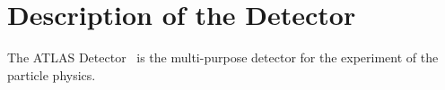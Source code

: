 \chapter{Description of the Detector}
The ATLAS Detector~\cite{Aad:2008zzm} is the multi-purpose detector for the experiment of the particle physics. 
